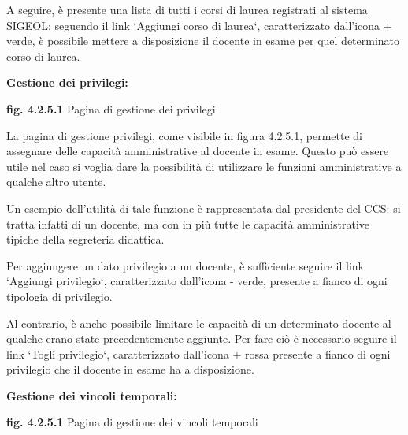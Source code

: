 \documentclass[11pt,a4paper]{article}
\begin{document}
A seguire, è presente una lista di tutti i corsi di laurea registrati al sistema SIGEOL: seguendo il link `Aggiungi corso di laurea`, caratterizzato dall'icona + verde, è possibile mettere a disposizione il docente in esame per quel determinato corso di laurea.
\newline \newline
\begin{large}\textbf{Gestione dei privilegi:}\end{large}

\bigskip
\begin{center}
	\textbf{fig. 4.2.5.1} Pagina di gestione dei privilegi\\
\end{center}
\bigskip

La pagina di gestione privilegi, come visibile in figura 4.2.5.1, permette di assegnare delle capacità amministrative al docente in esame. Questo può essere utile nel caso si voglia dare la possibilità di utilizzare le funzioni amministrative a qualche altro utente.

Un esempio dell'utilità di tale funzione è rappresentata dal presidente del CCS: si tratta infatti di un docente, ma con in più tutte le capacità amministrative tipiche della segreteria didattica.

Per aggiungere un dato privilegio a un docente, è sufficiente seguire il link `Aggiungi privilegio`, caratterizzato dall'icona - verde, presente a fianco di ogni tipologia di privilegio.

Al contrario, è anche possibile limitare le capacità di un determinato docente al qualche erano state precedentemente aggiunte. Per fare ciò è necessario seguire il link `Togli privilegio`, caratterizzato dall'icona + rossa presente a fianco di ogni privilegio che il docente in esame ha a disposizione.
\newline \newline
\begin{large}\textbf{Gestione dei vincoli temporali:}\end{large}

\bigskip
\begin{center}
	\textbf{fig. 4.2.5.1} Pagina di gestione dei vincoli temporali\\
\end{center}
\bigskip
\end{document}
